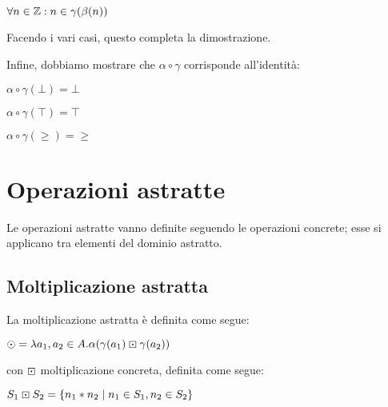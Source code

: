 \begin{center}
	$ \forall n \in \mathbb{Z} : n \in \gamma(\beta(n)) $
\end{center}
Facendo i vari casi, questo completa la dimostrazione.

Infine, dobbiamo mostrare che $\alpha \circ \gamma$ corrisponde all'identità:
\begin{center}
	$ \alpha \circ \gamma(\bot) = \bot $
\end{center}
\begin{center}
	$ \alpha \circ \gamma(\top) = \top $
\end{center}
\begin{center}
	$ \alpha \circ \gamma(\geq) = \geq $
\end{center}

\section{Operazioni astratte}
Le operazioni astratte vanno definite seguendo le operazioni concrete; esse si applicano tra elementi del dominio astratto.

\subsection{Moltiplicazione astratta}

La moltiplicazione astratta è definita come segue:

\begin{center}
	$ \mathbin{\odot} = \lambda a_1,a_2 \in A . \alpha(\gamma(a_1) \mathbin{\boxdot} \gamma(a_2)) $
\end{center}
con $\mathbin{\boxdot}$ moltiplicazione concreta, definita come segue:

\begin{center}
	$ S_1 \mathbin{\boxdot} S_2 = \{ n_1 * n_2 \mid n_1 \in S_1, n_2 \in S_2 \} $
\end{center}

